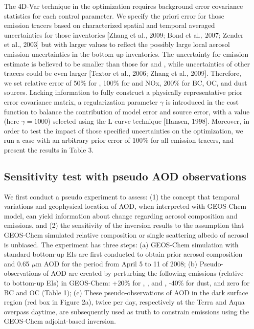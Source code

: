  The 4D-Var technique in the optimization requires background 
 error covariance statistics for each control parameter. 
 We specify the priori error for those emission tracers 
 based on characterized spatial and temporal averaged uncertainties for those inventories 
 [Zhang et al., 2009; Bond et al., 2007; Zender et al., 2003] 
 but with larger values to reflect the possibly large local aerosol emission 
 uncertainties in the bottom-up inventories. 
 The uncertainty for  emission estimate is believed 
 to be smaller than those for  and , 
 while uncertainties of other tracers could be even larger 
 [Textor et al., 2006; Zhang et al., 2009]. 
 Therefore, we set relative error of 50\% for , 100\% for  and NOx, 
 200\% for BC, OC, and dust sources. 
 Lacking information to fully construct a physically representative 
 prior error covariance matrix, a regularization parameter $\gamma$ 
 is introduced in the cost function to balance the contribution of model error and source error,  with a value (here $\gamma = 1000$) selected using the L-curve technique [Hansen, 1998]. 
 Moreover, in order to test the impact of those specified uncertainties on the optimization, 
 we run a case with an arbitrary prior error of 100\% for all emission tracers, 
 and present the results in Table 3. 

 \subsection{Sensitivity test with pseudo AOD observations}

 We first conduct a pseudo experiment to assess: 
 (1) the concept that temporal variations and geophysical location of AOD, 
 when interpreted with GEOS-Chem model, 
 can yield information about change regarding aerosol composition and emissions, 
 and (2) the sensitivity of the inversion results to the assumption 
 that GEOS-Chem simulated relative composition or single scattering albedo of aerosol is unbiased.
 The experiment has three steps:
 (a) GEOS-Chem simulation with standard bottom-up EIs 
 are first conducted to obtain prior aerosol composition 
 and 0.65 $\mu$m AOD for the period from April 5 to 11 of 2008; 
 (b) Pseudo-observations of AOD are created by perturbing the following emissions 
 (relative to bottom-up EIs) in GEOS-Chem: +20\% for , , and , 
 -40\% for dust, and zero for BC and OC (Table 1); 
 (c) These pseudo-observations of AOD in the dark surface region (red box in Figure 2a), 
 twice per day, respectively at the Terra and Aqua overpass daytime, 
 are subsequently used as truth to constrain emissions using the GEOS-Chem adjoint-based inversion. 

